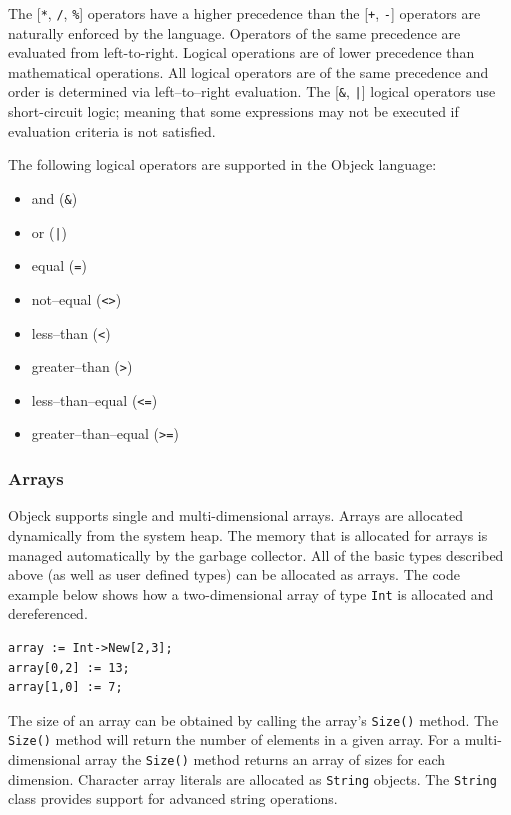\documentclass[11pt]{article}
\begin{document}
The [\texttt{*}, \texttt{/}, \texttt{\%}] operators have a higher
precedence than the [\texttt{+}, \texttt{-}] operators are naturally
enforced by the language. Operators of the same precedence are
evaluated from left-to-right.  Logical operations are of lower
precedence than mathematical operations. All logical operators are of
the same precedence and order is determined via left--to--right
evaluation.  The [\texttt{\&}, \texttt{|}] logical operators use
short-circuit logic; meaning that some expressions may not be executed
if evaluation criteria is not satisfied.

The following logical operators are supported in the Objeck language:
\begin{itemize}
\item and (\texttt{\&})
\item or (\texttt{|})
\item equal (\texttt{=})
\item not--equal (\texttt{<>})
\item less--than (\texttt{<})
\item greater--than (\texttt{>})
\item less--than--equal (\texttt{<=})
\item greater--than--equal (\texttt{>=})
\end{itemize}

\subsubsection{Arrays}
Objeck supports single and multi-dimensional arrays.  Arrays are
allocated dynamically from the system heap.  The memory that is
allocated for arrays is managed automatically by the garbage
collector.  All of the basic types described above (as well as user
defined types) can be allocated as arrays.  The code example below
shows how a two-dimensional array of type \texttt{Int} is allocated
and dereferenced.

\begin{verbatim}
array := Int->New[2,3];
array[0,2] := 13;
array[1,0] := 7;
\end{verbatim}

The size of an array can be obtained by calling the array's
\texttt{Size()} method.  The \texttt{Size()} method will return the
number of elements in a given array.  For a multi-dimensional array
the \texttt{Size()} method returns an array of sizes for each dimension.  
Character array literals are allocated as \texttt{String} objects.
The \texttt{String} class provides support for advanced string operations.
\end{document}
